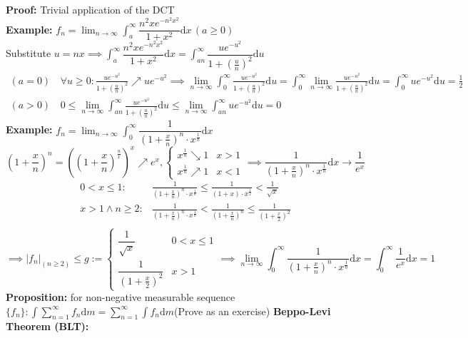 \documentclass{article}
\newcommand{\sumninf}{\displaystyle\sum_{n=1}^\infty}
\newcommand{\limninf}{\displaystyle\lim_{n\to\infty}}
\newcommand{\0}{{\bf{0}}}
\newcommand{\1}{{\bf{1}}}
\newcommand{\dint}{\displaystyle\int}
\newcommand{\dif}{\mbox{d}}
\newcommand{\incto}{\nearrow}
\newcommand{\decto}{\searrow}
\begin{document}
\textbf{Proof:} Trivial application of the DCT\\
\textbf{Example:} $f_n=\limninf\dint_a^\infty\dfrac{n^2xe^{-n^2x^2}}{1+x^2}\dif x\,(a\geq0)$\\
Substitute $u=nx\implies\dint_a^\infty\dfrac{n^2xe^{-n^2x^2}}{1+x^2}\dif x=\dint_{an}^\infty\dfrac{ue^{-u^2}}{1+(\frac{u}{n})^2}\dif u$
\begin{equation}
\begin{split}
    (a=0)\,&\forall u\geq0:\frac{ue^{-u^2}}{1+(\frac{u}{n})^2}\incto ue^{-u^2}\implies\limninf\int_0^\infty\frac{ue^{-u^2}}{1+(\frac{u}{n})^2}\dif u=\dint_0^\infty\limninf\frac{ue^{-u^2}}{1+(\frac{u}{n})^2}\dif u=\int_0^\infty ue^{-u^2}\dif u=\frac{1}{2}\\
    (a>0)\,&0\le\limninf\int_{an}^\infty\frac{ue^{-u^2}}{1+(\frac{u}{n})^2}\dif u\le\limninf\int_{an}^\infty ue^{-u^2}\dif u=0
\end{split}
\end{equation}
\textbf{Example:} $f_n=\limninf\dint_0^\infty\dfrac{1}{(1+\frac{x}{n})^n\cdot x^{\frac{1}{n}}}\dif x$
$$\left(1+\frac{x}{n}\right)^n=\left(\left(1+\frac{x}{n}\right)^{\frac{n}{x}}\right)^x\incto e^x,\begin{cases}
    x^{\frac{1}{n}}\decto1&x>1\\
    x^{\frac{1}{n}}\incto1&x<1
\end{cases}\implies\dfrac{1}{(1+\frac{x}{n})^n\cdot x^{\frac{1}{n}}}\dif x\to\dfrac{1}{e^x}$$
\begin{equation}
\begin{split}
    0<x\le1:&\frac{1}{(1+\frac{x}{n})^n\cdot x^{\frac{1}{n}}}\le\frac{1}{(1+x)\cdot x^{\frac{1}{2}}}<\frac{1}{\sqrt{x}}\\
    x>1\land n\geq2:&\frac{1}{(1+\frac{x}{n})^n\cdot x^{\frac{1}{n}}}<\frac{1}{(1+\frac{x}{n})^n}\le\frac{1}{(1+\frac{x}{2})^2}\\
\end{split}
\end{equation}
$$\implies|f_n|_{(n\geq2)}\le g:=\begin{cases}
    \dfrac{1}{\sqrt{x}}&0<x\le1\\
    \dfrac{1}{(1+\frac{x}{2})^2}&x>1
\end{cases}\implies\limninf\int_0^\infty\dfrac{1}{(1+\frac{x}{n})^n\cdot x^{\frac{1}{n}}}\dif x=\int_0^\infty\frac{1}{e^x}\dif x=1$$
\textbf{Proposition:} for non-negative measurable sequence $\{f_n\}:\dint\sumninf f_n\dif m=\sumninf\dint f_n\dif m$\null\hfill{(Prove as an exercise)}
\textbf{Beppo-Levi Theorem (BLT):}\\
\end{document}
